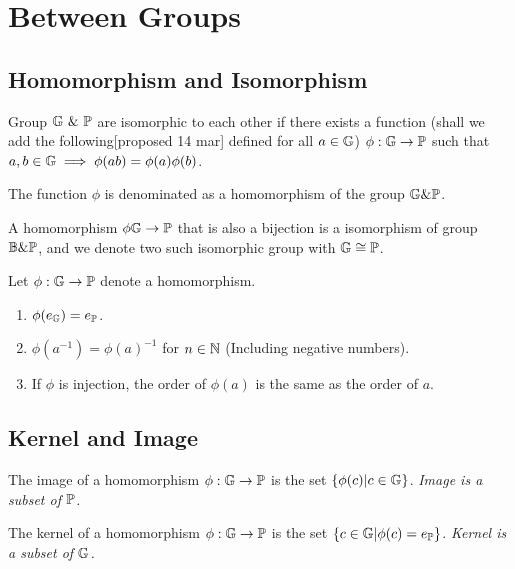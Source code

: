 \documentclass[../note.tex]{subfiles}
\begin{document}
\section{Between Groups}

\subsection{Homomorphism and Isomorphism}

\begin{definition}[Homomorphism]
	Group $\mathbb{G}\ \& \ \mathbb{P}$ are isomorphic to each other if there exists a function (shall we add the following[proposed 14 mar]  defined for all $a \in \mathbb{G}$)
	$\phi: \mathbb{G}\rightarrow \mathbb{P}$ such that	$ a, b \in \mathbb{G} \implies \phi(ab) = \phi(a)\phi(b)$.

	The function $\phi$ is denominated as a homomorphism of the group $\mathbb{G}\&\mathbb{P}$.
\end{definition}

\begin{definition}[Isomorphism]
	A homomorphism $\phi \mathbb{G} \rightarrow \mathbb{P}$ that is also a bijection is a isomorphism of group $\mathbb{B}\&\mathbb{P}$, and we denote two such isomorphic group with $\mathbb{G} \cong \mathbb{P}$.
\end{definition}

\begin{theorem}
	Let $\phi: \mathbb{G} \rightarrow \mathbb{P}$ denote a homomorphism. 
\begin{enumerate}
	\item $\phi(e_{\mathbb{G}}) = e_{\mathbb{P}}$. 
	\item $\phi(a^{-1}) = \phi(a)^{-1}$ for $n\in \mathbb{N}$ (Including negative numbers).
	\item If $\phi$ is injection, the order of $\phi(a)$ is the same as the order of $a$.
\end{enumerate}
\end{theorem}

\subsection{Kernel and Image}
\begin{definition}[Image]
	The image of a homomorphism $\phi: \mathbb{G} \rightarrow \mathbb{P}$ is the set $\{\phi(c) |c \in \mathbb{G}\}$.
	\emph{Image is a subset of $\mathbb{P}$.}
\end{definition}
\begin{definition}[Kernel] 
	The kernel of a homomorphism $\phi: \mathbb{G} \rightarrow \mathbb{P}$ is the set $\{c \in \mathbb{G} | \phi(c) = e_{\mathbb{P}}\}$.
	\emph{Kernel is a subset of $\mathbb{G}$.}
\end{definition}
\end{document}
